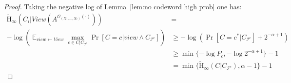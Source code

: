 \documentclass[11pt]{article}
\newcommand{\lemref}[1]{\mbox{Lemma~\ref{#1}}}
\DeclareMathOperator*{\expe}{\mathbb{E}}
\newcommand{\hillrlx}{\ensuremath{\mathtt{HILL\mhyphen rlx}}\xspace}
\newcommand{\poly}{\ensuremath{\mathtt{poly}}\xspace}
\newcommand{\ngl}{\ensuremath{\mathtt{ngl}}\xspace}
\newcommand{\Hoo}{\mathrm{H}_\infty}
\newcommand{\Hav}{\tilde{\mathrm{H}}_\infty}
\newtheorem{lemma}[theorem]{Lemma}
\begin{document}
\begin{proof}
Taking the negative log of \lemref{lem:no codeword high prob} one has:
\begin{align*}
\Hav(C_i |  View(A^{\mathcal{O}_{(X_1,..., X_\ell)}(\cdot)}))
 &= \\
 -\log \left(\expe_{view \leftarrow View}\max_{c\in C|C_{\mathcal{I}^c}}\Pr[C =c | view \wedge C_{\mathcal{I}^c} ]  \right) &\geq -\log (\Pr[C=c^* | C_{\mathcal{I}^c} ]+ 2^{-\alpha+1}) \\
 &\geq \min \{-\log P_c, -\log 2^{-\alpha+1}\} -1\\
 &= \min \{ \Hav(C | C_{\mathcal{I}^c}), \alpha-1\}-1 
\end{align*}
\end{proof}
\end{document}
